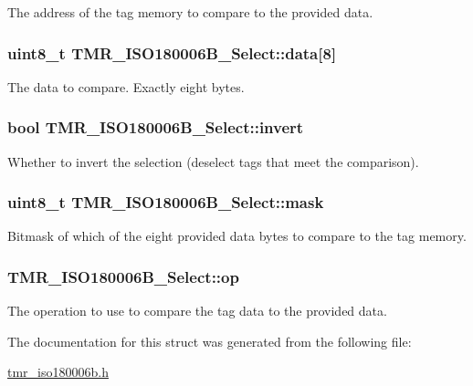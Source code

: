 The address of the tag memory to compare to the provided data. \hypertarget{struct_t_m_r___i_s_o180006_b___select_1b8c2c94c0403b0ff5057c2d8fef03cc}{
\subsubsection[{data}]{\setlength{\rightskip}{0pt plus 5cm}uint8\_\-t {\bf TMR\_\-ISO180006B\_\-Select::data}\mbox{[}8\mbox{]}}}
\label{struct_t_m_r___i_s_o180006_b___select_1b8c2c94c0403b0ff5057c2d8fef03cc}


The data to compare. Exactly eight bytes. \hypertarget{struct_t_m_r___i_s_o180006_b___select_7798ef47714274299461115039418bc0}{
\subsubsection[{invert}]{\setlength{\rightskip}{0pt plus 5cm}bool {\bf TMR\_\-ISO180006B\_\-Select::invert}}}
\label{struct_t_m_r___i_s_o180006_b___select_7798ef47714274299461115039418bc0}


Whether to invert the selection (deselect tags that meet the comparison). \hypertarget{struct_t_m_r___i_s_o180006_b___select_2f73d5038704751e6e9c10c1e832f20d}{
\subsubsection[{mask}]{\setlength{\rightskip}{0pt plus 5cm}uint8\_\-t {\bf TMR\_\-ISO180006B\_\-Select::mask}}}
\label{struct_t_m_r___i_s_o180006_b___select_2f73d5038704751e6e9c10c1e832f20d}


Bitmask of which of the eight provided data bytes to compare to the tag memory. \hypertarget{struct_t_m_r___i_s_o180006_b___select_0b84ba81a8847ce74017c14a5adf516c}{
\subsubsection[{op}]{ {\bf TMR\_\-ISO180006B\_\-Select::op}}}
\label{struct_t_m_r___i_s_o180006_b___select_0b84ba81a8847ce74017c14a5adf516c}


The operation to use to compare the tag data to the provided data. 

The documentation for this struct was generated from the following file:\begin{CompactItemize}
\item 
\hyperlink{tmr__iso180006b_8h}{tmr\_\-iso180006b.h}\end{CompactItemize}
